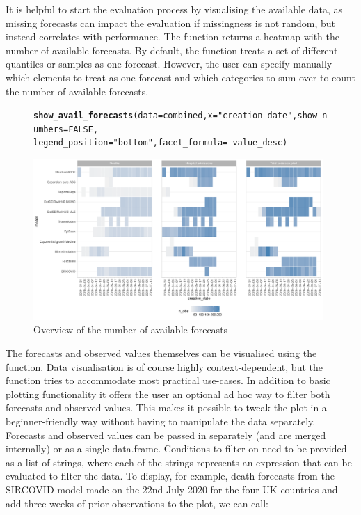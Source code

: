 \documentclass[article,shortnames]{jss}\usepackage[]{graphicx}\usepackage[]{color}
\makeatletter
\newcommand{\hlnum}[1]{\textcolor[rgb]{0.686,0.059,0.569}{#1}}%
\newcommand{\hlstr}[1]{\textcolor[rgb]{0.192,0.494,0.8}{#1}}%
\newcommand{\hlopt}[1]{\textcolor[rgb]{0,0,0}{#1}}%
\newcommand{\hlstd}[1]{\textcolor[rgb]{0.345,0.345,0.345}{#1}}%
\newcommand{\hlkwc}[1]{\textcolor[rgb]{0.333,0.667,0.333}{#1}}%
\newcommand{\hlkwd}[1]{\textcolor[rgb]{0.737,0.353,0.396}{\textbf{#1}}}%
\newenvironment{kframe}{%
 \def\at@end@of@kframe{}%
 \ifinner\ifhmode%
  \def\at@end@of@kframe{\end{minipage}}%
  \begin{minipage}{\columnwidth}%
 \fi\fi%
 \def\FrameCommand##1{\hskip\@totalleftmargin \hskip-\fboxsep
 \colorbox{shadecolor}{##1}\hskip-\fboxsep
     \hskip-\linewidth \hskip-\@totalleftmargin \hskip\columnwidth}%
 \MakeFramed {\advance\hsize-\width
   \@totalleftmargin\z@ \linewidth\hsize
   \@setminipage}}%
 {\par\unskip\endMakeFramed%
 \at@end@of@kframe}
\newenvironment{knitrout}{}{} %
\newcommand{\fct}[1]{\code{#1()}}
\makeatother
\begin{document}
% 
It is helpful to start the evaluation process by visualising the available data, as missing forecasts can impact the evaluation if missingness is not random, but instead correlates with performance. The function \fct{show\_avail\_forecasts} returns a heatmap with the number of available forecasts. By default, the function treats a set of different quantiles or samples as one forecast. However, the user can specify manually which elements to treat as one forecast and which categories to sum over to count the number of available forecasts. 
% 
\begin{figure}[h]
\centering
\begin{knitrout}
\color{fgcolor}\begin{kframe}
\begin{alltt}
\hlkwd{show_avail_forecasts}\hlstd{(}\hlkwc{data} \hlstd{= combined,} \hlkwc{x} \hlstd{=} \hlstr{"creation_date"}\hlstd{,} \hlkwc{show_numbers} \hlstd{=} \hlnum{FALSE}\hlstd{,}
    \hlkwc{legend_position} \hlstd{=} \hlstr{"bottom"}\hlstd{,} \hlkwc{facet_formula} \hlstd{=} \hlopt{~}\hlstd{value_desc)}
\end{alltt}
\end{kframe}
\includegraphics[width=0.98\textwidth]{plots/plot-show-availability-1} 
\end{knitrout}
\caption{\label{fig:avail-forecasts} Overview of the number of available forecasts}
\end{figure}
% 
The forecasts and observed values themselves can be visualised using the \fct{plot\_predictions} function. Data visualisation is of course highly context-dependent, but the function tries to accommodate most practical use-cases. In addition to basic plotting functionality it offers the user an optional ad hoc way to filter both forecasts and observed values. This makes it possible to tweak the plot in a beginner-friendly way without having to manipulate the data separately. Forecasts and observed values can be passed in separately (and are merged internally) or as a single data.frame. Conditions to filter on need to be provided as a list of strings, where each of the strings represents an expression that can be evaluated to filter the data. To display, for example, death forecasts from the SIRCOVID model made on the 22nd July 2020 for the four UK countries and add three weeks of prior observations to the plot, we can call: %
\end{document}
